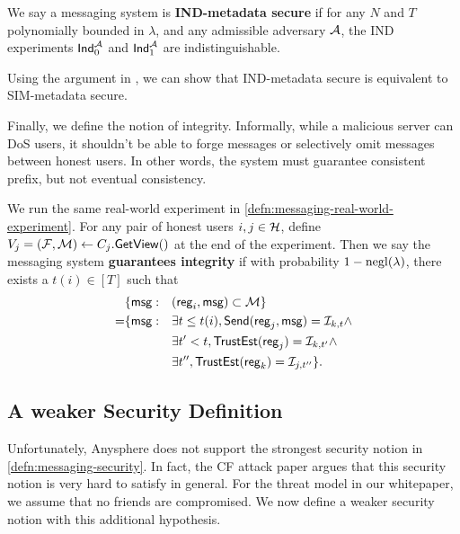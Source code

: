 \begin{definition}
\label{defn:messaging-IND-security}
We say a messaging system is \textbf{IND-metadata secure} if for any $N$ and $T$ polynomially bounded in $\lambda$, and any admissible adversary $\mathcal{A}$, the IND experiments $\mathsf{Ind}_0^{\mathcal{A}}$ and $\mathsf{Ind}_1^{\mathcal{A}}$ are indistinguishable.
\end{definition}

Using the argument in \cite{shi2021non}, we can show that IND-metadata secure is equivalent to SIM-metadata secure.

Finally, we define the notion of integrity. Informally, while a malicious server can DoS users, it shouldn't be able to forge messages  or selectively omit messages between honest users. In other words, the system must guarantee consistent prefix, but not eventual consistency.
\begin{definition}
\label{defn:messaging-integrity}
We run the same real-world experiment in \cref{defn:messaging-real-world-experiment}. For any pair of honest users $i, j \in \mathcal{H}$, define $V_j = (\mathcal{F}, \mathcal{M}) \leftarrow C_j.\mathsf{GetView}()$ at the end of the experiment. Then we say the messaging system \textbf{guarantees integrity} if with probability $1 - \operatorname{negl}(\lambda)$, there exists a $t(i) \in [T]$ such that
\begin{align*}
     &\{\mathsf{msg}: &&(\mathsf{reg}_i, \mathsf{msg}) \subset \mathcal{M}\} \\
      =& \{\mathsf{msg}: &&\exists t \leq t(i), \mathsf{Send}(\mathsf{reg}_j, \mathsf{msg}) = \mathcal{I}_{k, t} \land \\
          &   &&\exists t' < t, \mathsf{TrustEst}(\mathsf{reg}_j) = \mathcal{I}_{k, t'} \land \\
          &   &&\exists t'', \mathsf{TrustEst}(\mathsf{reg}_k) = \mathcal{I}_{j, t''}\}.
\end{align*}
\end{definition}

\subsection{A weaker Security Definition}
\label{subsec:messaging-security-weaker}
Unfortunately, Anysphere does not support the strongest security notion in \cref{defn:messaging-security}. In fact, the CF attack paper \cite{angel2018cf} argues that this security notion is very hard to satisfy in general. For the threat model in our whitepaper, we assume that no friends are compromised. We now define a weaker security notion with this additional hypothesis.



